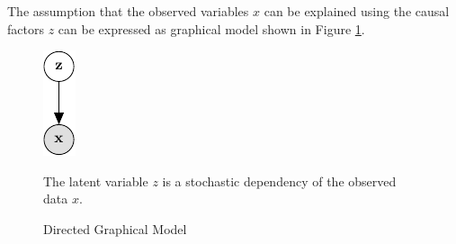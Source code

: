 



The assumption that the observed variables $x$ can be explained using the causal factors $z$ can be expressed as graphical model shown in Figure \ref{fig:dgm}.

\begin{figure}[htb]
\centering
\includegraphics{media/directed_graphical_model}
  \caption[Graphical Model]{Directed Graphical Model}
  \label{fig:dgm}
  \medskip
  \small
  The latent variable $z$ is a stochastic dependency of the observed data $x$.
\end{figure}


\newpage













